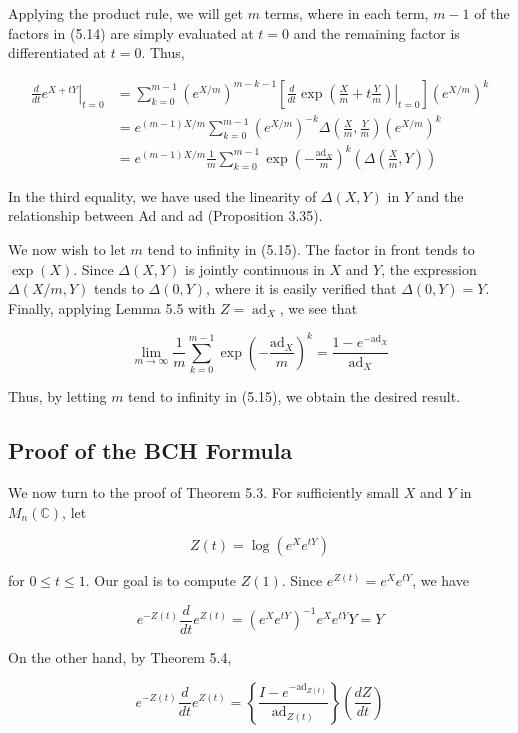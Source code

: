\documentclass[10pt, letterpaper]{article}
\begin{document}
Applying the product rule, we will get $m$ terms, where in each term, $m-1$ of the factors in (5.14) are simply evaluated at $t=0$ and the remaining factor is differentiated at $t=0$. Thus,

$$
\begin{aligned}
\left.\frac{d}{d t} e^{X+t Y}\right|_{t=0} & =\sum_{k=0}^{m-1}\left(e^{X / m}\right)^{m-k-1}\left[\left.\frac{d}{d t} \exp \left(\frac{X}{m}+t \frac{Y}{m}\right)\right|_{t=0}\right]\left(e^{X / m}\right)^{k} \\
& =e^{(m-1) X / m} \sum_{k=0}^{m-1}\left(e^{X / m}\right)^{-k} \Delta\left(\frac{X}{m}, \frac{Y}{m}\right)\left(e^{X / m}\right)^{k} \\
& =e^{(m-1) X / m} \frac{1}{m} \sum_{k=0}^{m-1} \exp \left(-\frac{\mathrm{ad}_{X}}{m}\right)^{k}\left(\Delta\left(\frac{X}{m}, Y\right)\right)
\end{aligned}
$$

In the third equality, we have used the linearity of $\Delta(X, Y)$ in $Y$ and the relationship between Ad and ad (Proposition 3.35).

We now wish to let $m$ tend to infinity in (5.15). The factor in front tends to $\exp (X)$. Since $\Delta(X, Y)$ is jointly continuous in $X$ and $Y$, the expression $\Delta(X / m, Y)$ tends to $\Delta(0, Y)$, where it is easily verified that $\Delta(0, Y)=Y$. Finally, applying Lemma 5.5 with $Z=\operatorname{ad}_{X}$, we see that

$$
\lim _{m \rightarrow \infty} \frac{1}{m} \sum_{k=0}^{m-1} \exp \left(-\frac{\mathrm{ad}_{X}}{m}\right)^{k}=\frac{1-e^{-\mathrm{ad}_{X}}}{\mathrm{ad}_{X}}
$$

Thus, by letting $m$ tend to infinity in (5.15), we obtain the desired result.

\subsection*{Proof of the BCH Formula}
We now turn to the proof of Theorem 5.3. For sufficiently small $X$ and $Y$ in $M_{n}(\mathbb{C})$, let

$$
Z(t)=\log \left(e^{X} e^{t Y}\right)
$$

for $0 \leq t \leq 1$. Our goal is to compute $Z(1)$. Since $e^{Z(t)}=e^{X} e^{t Y}$, we have

$$
e^{-Z(t)} \frac{d}{d t} e^{Z(t)}=\left(e^{X} e^{t Y}\right)^{-1} e^{X} e^{t Y} Y=Y
$$

On the other hand, by Theorem 5.4,

$$
e^{-Z(t)} \frac{d}{d t} e^{Z(t)}=\left\{\frac{I-e^{-\mathrm{ad}_{Z(t)}}}{\operatorname{ad}_{Z(t)}}\right\}\left(\frac{d Z}{d t}\right)
$$
\end{document}
